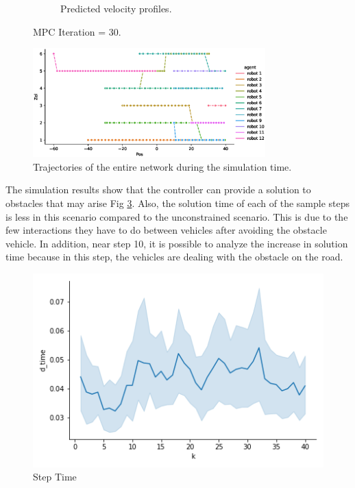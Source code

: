\begin{figure}[H]
\begin{subfigure}[b]{0.45\textwidth}
    \caption{Predicted velocity profiles.}
    \label{fig:third}
\end{subfigure}
\caption{MPC Iteration = 30.}
\label{fig:figures}
\end{figure}
\begin{figure}[H]
\centering
    \includegraphics[width=0.8\textwidth]{Kap6/obs_avoid/obs_avoid_trajectories.eps}
    \caption{Trajectories of the entire network during the simulation time.}
\end{figure}



The simulation results show that the controller can provide a solution to obstacles that may arise Fig \ref{obs_avoid_step_time}. Also, the solution time of each of the sample steps is less in this scenario compared to the unconstrained scenario. This is due to the few interactions they have to do between vehicles after avoiding the obstacle vehicle. In addition, near step 10, it is possible to analyze the increase in solution time because in this step, the vehicles are dealing with the obstacle on the road.

\begin{figure}[H]
\centering
    \includegraphics[width=.6\textwidth]{Kap6/obs_avoid/obs_avoid_d_time.png}
    \caption{Step Time}
    \label{obs_avoid_step_time}
\end{figure}


